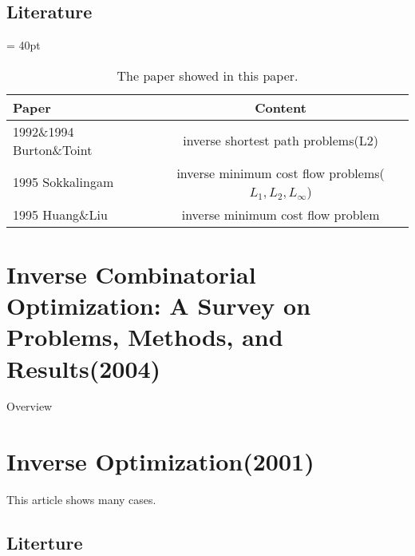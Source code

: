 \documentclass[UTF8]{article}
\begin{document}
\subsection{Literature}


\begin{table}[ht]
 
 \tabcolsep = 40pt
 
 \small\renewcommand{}
 
 \caption{The paper showed in this paper.\label{tab:2}}
 
 {\begin{tabular}{lc}
   \hline
   Paper                    & Content                                                 \\
   \hline
   1992\&1994 Burton\&Toint & inverse shortest path problems(L2)                      \\
   \hline
   1995 Sokkalingam         & inverse minimum cost flow problems($L_1,L_2,L_\infty $) \\
   \hline
   1995 Huang\&Liu          & inverse minimum cost flow problem                       \\
   \hline
  \end{tabular}}
 {}
\end{table}


\section{Inverse Combinatorial Optimization: A Survey on Problems, Methods, and Results(2004)}

Overview



\section{Inverse Optimization(2001)}

This article shows many cases.


\subsection{Literture}
\end{document}
